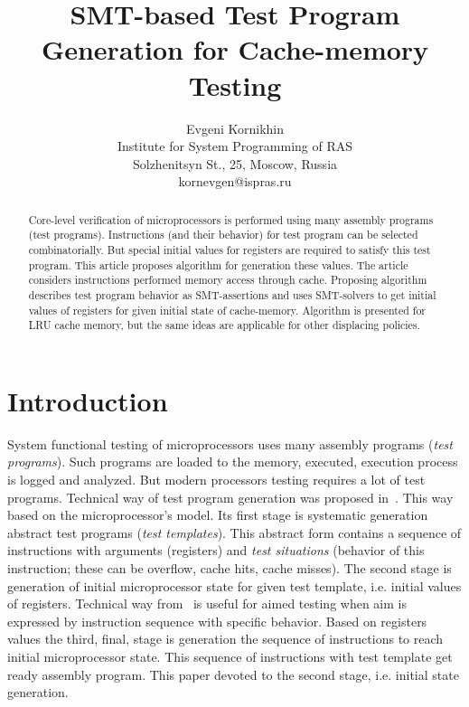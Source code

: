 \documentclass[times, 10pt,twocolumn]{article}
\begin{document}
\title{SMT-based Test Program Generation for Cache-memory Testing}

\author{Evgeni Kornikhin\\
Institute for System Programming of RAS\\ Solzhenitsyn St., 25,
Moscow, Russia\\ kornevgen@ispras.ru\\
}

\maketitle
\thispagestyle{empty}

\begin{abstract}
Core-level verification of microprocessors is performed using many
assembly programs (test programs). Instructions (and their behavior)
for test program can be selected combinatorially. But special
initial values for registers are required to satisfy this test
program. This article proposes algorithm for generation these
values. The article considers instructions performed memory access
through cache. Proposing algorithm describes test program behavior
as SMT-assertions and uses SMT-solvers to get initial values of
registers for given initial state of cache-memory. Algorithm is
presented for LRU cache memory, but the same ideas are applicable
for other displacing policies.
\end{abstract}



\section{Introduction}

System functional testing of microprocessors uses many assembly
programs (\emph{test programs}). Such programs are loaded to the
memory, executed, execution process is logged and analyzed. But
modern processors testing requires a lot of test programs. Technical
way of test program generation was proposed in~\cite{kamkin}. This
way based on the microprocessor's model. Its first stage is
systematic generation abstract test programs (\emph{test
templates}). This abstract form contains a sequence of instructions
with arguments (registers) and \emph{test situations} (behavior of
this instruction; these can be overflow, cache hits, cache misses).
The second stage is generation of initial microprocessor state for
given test template, i.e. initial values of registers. Technical way
from~\cite{kamkin} is useful for aimed testing when aim is expressed
by instruction sequence with specific behavior. Based on registers
values the third, final, stage is generation the sequence of
instructions to reach initial microprocessor state. This sequence of
instructions with test template get ready assembly program. This
paper devoted to the second stage, i.e. initial state generation.
\end{document}
